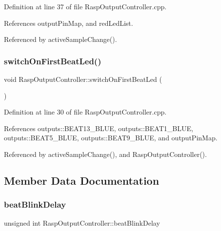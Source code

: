 Definition at line 37 of file Rasp\+Output\+Controller.\+cpp.



References output\+Pin\+Map, and red\+Led\+List.



Referenced by active\+Sample\+Change().

\mbox{\label{class_rasp_output_controller_a0cacbc3cbca8f1b78318234c6b74e576}} 
\subsubsection{\texorpdfstring{switch\+On\+First\+Beat\+Led()}{switchOnFirstBeatLed()}}
{\footnotesize\ttfamily void Rasp\+Output\+Controller\+::switch\+On\+First\+Beat\+Led (\begin{DoxyParamCaption}{ }\end{DoxyParamCaption})\hspace{0.3cm}{\ttfamily [private]}}



Definition at line 30 of file Rasp\+Output\+Controller.\+cpp.



References outputs\+::\+B\+E\+A\+T13\+\_\+\+B\+L\+UE, outputs\+::\+B\+E\+A\+T1\+\_\+\+B\+L\+UE, outputs\+::\+B\+E\+A\+T5\+\_\+\+B\+L\+UE, outputs\+::\+B\+E\+A\+T9\+\_\+\+B\+L\+UE, and output\+Pin\+Map.



Referenced by active\+Sample\+Change(), and Rasp\+Output\+Controller().



\subsection{Member Data Documentation}
\mbox{\label{class_rasp_output_controller_a4deb199f7d611c2be39dc2d59ea45bba}} 
\subsubsection{\texorpdfstring{beat\+Blink\+Delay}{beatBlinkDelay}}
{\footnotesize\ttfamily unsigned int Rasp\+Output\+Controller\+::beat\+Blink\+Delay\hspace{0.3cm}{\ttfamily [private]}}



